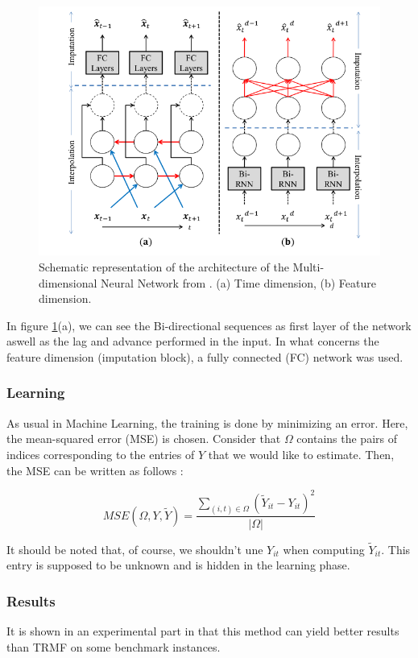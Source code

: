 \documentclass{article}
\begin{document}
\begin{figure}[H]
\centering
\includegraphics[scale=0.3]{MRNN}
\caption{Schematic representation of the architecture of the Multi-dimensional Neural Network from \cite{Yoon2017MultidirectionalRN}. (a) Time dimension, (b) Feature dimension.}
\label{im:MRNN}
\end{figure}

In figure \ref{im:MRNN}(a), we can see the Bi-directional sequences as first layer of the network aswell as the lag and advance performed in the input. In what concerns the feature dimension (imputation block), a fully connected (FC) network was used.

\subsubsection*{Learning}
As usual in Machine Learning, the training is done by minimizing an error. Here, the mean-squared error (MSE) is chosen. Consider that $\Omega$ contains the pairs of indices corresponding to the entries of $Y$ that we would like to estimate. Then, the MSE can be written as follows :

$$MSE(\Omega, Y, \tilde{Y}) = \frac{\sum_{(i,t) \in \Omega} (\tilde{Y}_{it} - Y_{it})^2}{|\Omega|}$$

It should be noted that, of course, we shouldn't une $Y_{it}$ when computing $\tilde{Y}_{it}$. This entry is supposed to be unknown and is hidden in the learning phase.

\subsubsection*{Results}
It is shown in an experimental part in \cite{Yoon2017MultidirectionalRN} that this method can yield better results than TRMF on some benchmark instances.
\end{document}
